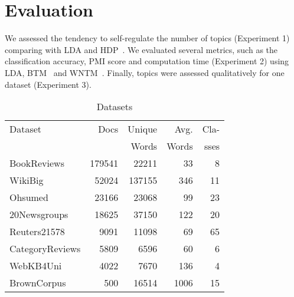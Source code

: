 \documentclass[twocolumn,10]{article}
\newcommand{\ci}{~\cite} \newcommand{\re}{~\ref} \newcommand{\ma}{\mathbb}
\begin{document}
	\section{Evaluation} \label{sec:eval}
	 We assessed the tendency to self-regulate the number of topics (Experiment 1) comparing with LDA and HDP\ci{wan11}. We evaluated several metrics, such as the classification accuracy, PMI score and computation time (Experiment 2) using LDA, BTM\ci{yan13} and WNTM\ci{zuo16}. Finally, topics were assessed qualitatively for one dataset (Experiment 3).	%
			\begin{table}[htp]%
				\centering
				\begin{small}
					\setlength\tabcolsep{1pt}
					\begin{tabular}{| l | r | r | r | r|}
						\hline		  					Dataset & Docs & Unique & \small{Avg.} & \small{Cla-}\\
						& & Words & \small{Words} &\small{sses}\\ \hline
						BookReviews&179541 & 22211&33&8\\ \hline
						WikiBig&52024 & 137155&346&11\\ \hline
						Ohsumed&23166 & 23068&99&23\\ \hline
						20Newsgroups&18625 & 37150&122&20\\ \hline
						Reuters21578&9091 & 11098&69&65\\ \hline
						CategoryReviews&5809 & 6596&60&6\\ \hline
						WebKB4Uni&4022 & 7670&136&4\\ \hline
						BrownCorpus&500 & 16514&1006&15\\ \hline
					\end{tabular}
				\end{small}
				\caption{Datasets}\label{tab:ds}
				\vspace{-8pt}
			\end{table} 
			\vspace{-14pt}
\end{document}
